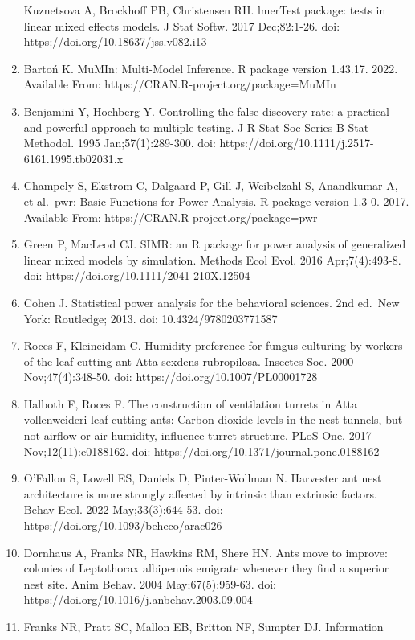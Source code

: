 \documentclass[3p]{elsarticle} %
\begin{document}
\begin{enumerate}
  Kuznetsova A, Brockhoff PB, Christensen RH. lmerTest package: tests in
  linear mixed effects models. J Stat Softw. 2017 Dec;82:1-26. doi:
  https://doi.org/10.18637/jss.v082.i13
\item
  Bartoń K. MuMIn: Multi-Model Inference. R package version 1.43.17.
  2022. Available From: https://CRAN.R-project.org/package=MuMIn
\item
  Benjamini Y, Hochberg Y. Controlling the false discovery rate: a
  practical and powerful approach to multiple testing. J R Stat Soc
  Series B Stat Methodol. 1995 Jan;57(1):289-300. doi:
  https://doi.org/10.1111/j.2517-6161.1995.tb02031.x
\item
  Champely S, Ekstrom C, Dalgaard P, Gill J, Weibelzahl S, Anandkumar A,
  et al.~pwr: Basic Functions for Power Analysis. R package version
  1.3-0. 2017. Available From: https://CRAN.R-project.org/package=pwr
\item
  Green P, MacLeod CJ. SIMR: an R package for power analysis of
  generalized linear mixed models by simulation. Methods Ecol Evol. 2016
  Apr;7(4):493-8. doi: https://doi.org/10.1111/2041-210X.12504
\item
  Cohen J. Statistical power analysis for the behavioral sciences. 2nd
  ed.~New York: Routledge; 2013. doi: 10.4324/9780203771587
\item
  Roces F, Kleineidam C. Humidity preference for fungus culturing by
  workers of the leaf-cutting ant Atta sexdens rubropilosa. Insectes
  Soc. 2000 Nov;47(4):348-50. doi: https://doi.org/10.1007/PL00001728
\item
  Halboth F, Roces F. The construction of ventilation turrets in Atta
  vollenweideri leaf-cutting ants: Carbon dioxide levels in the nest
  tunnels, but not airflow or air humidity, influence turret structure.
  PLoS One. 2017 Nov;12(11):e0188162. doi:
  https://doi.org/10.1371/journal.pone.0188162
\item
  O'Fallon S, Lowell ES, Daniels D, Pinter-Wollman N. Harvester ant nest
  architecture is more strongly affected by intrinsic than extrinsic
  factors. Behav Ecol. 2022 May;33(3):644-53. doi:
  https://doi.org/10.1093/beheco/arac026
\item
  Dornhaus A, Franks NR, Hawkins RM, Shere HN. Ants move to improve:
  colonies of Leptothorax albipennis emigrate whenever they find a
  superior nest site. Anim Behav. 2004 May;67(5):959-63. doi:
  https://doi.org/10.1016/j.anbehav.2003.09.004
\item
  Franks NR, Pratt SC, Mallon EB, Britton NF, Sumpter DJ. Information

\end{enumerate}
\end{document}

